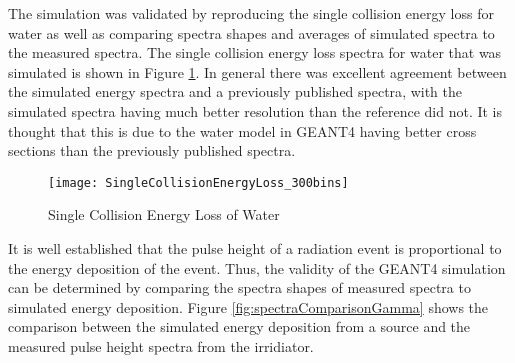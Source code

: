 \documentclass[draftcls,onecolumn]{IEEEtran}
\begin{document}
The simulation was validated by reproducing the single collision energy loss for water as well as comparing spectra shapes and averages of simulated spectra to the measured spectra.
The single collision energy loss spectra for water that was simulated is shown in Figure \ref{fig:SingleCollisionELossWater}.
In general there was excellent agreement between the simulated energy spectra and a previously published spectra\cite{turner_comparative_1982}, with the simulated spectra having much better resolution than the reference did not.
It is thought that this is due to the water model in GEANT4 having better cross sections than the previously published spectra.
\begin{figure}[ht]
  \centering
  \texttt{[image: SingleCollisionEnergyLoss\_300bins]}
  \caption{Single Collision Energy Loss of Water}
	\label{fig:SingleCollisionELossWater}
\end{figure}

It is well established that the pulse height of a radiation event is proportional to the energy deposition of the event\cite{birks_scintillations_1951}.
Thus, the validity of the GEANT4 simulation can be determined by comparing the spectra shapes of measured spectra to simulated energy deposition.
Figure \ref{fig:spectraComparisonGamma} shows the comparison between the simulated energy deposition from a  source and the measured pulse height spectra from the  irridiator.
\end{document}
